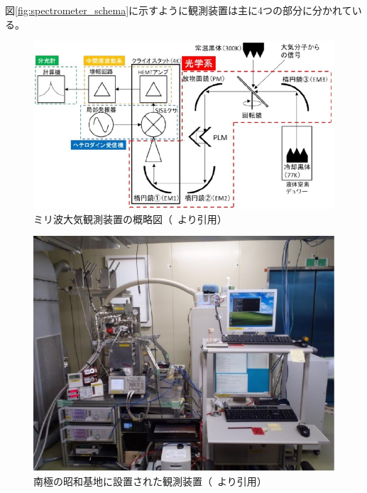 図\ref{fig:spectrometer_schema}に示すように観測装置は主に4つの部分に分かれている。
\begin{figure}[htbp]
    \centering
    \includegraphics[width=\linewidth]{master_thesis_contents/master_thesis_fig/mm_component.pdf}
    \caption{ミリ波大気観測装置の概略図（~\cite{ito2017master}より引用）}
    \label{fig:mm_component}
\end{figure}
\begin{figure}[htbp]
    \centering
    \includegraphics[width=\linewidth]{master_thesis_contents/master_thesis_fig/mmobs_spectrometer_syowa.pdf}
    \caption{南極の昭和基地に設置された観測装置（~\cite{uemura2014master}より引用）}
    \label{fig:mmobs_spectrometer_syowa}
\end{figure}
